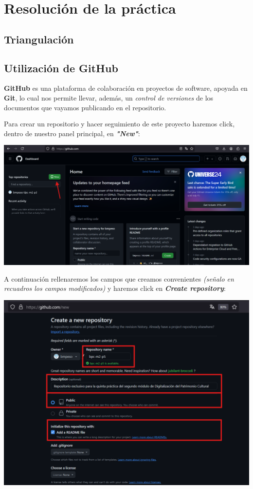 \documentclass[options]{article}
\begin{document}
\pagebreak

\section{Resolución de la práctica}
\subsection{Triangulación}

\subsection{Utilización de GitHub}

\textbf{GitHub} es una plataforma de colaboración en proyectos de software, apoyada en \textbf{Git}, lo cual nos permite llevar, además, un \textit{control de versiones} de los documentos que vayamos publicando en el repositorio. 


Para crear un repositorio y hacer seguimiento de este proyecto haremos click, dentro de nuestro panel principal, en \textbf{\textit{"New"}}:

\begin{center}
    \includegraphics[scale=0.35]{images/github_01.png}
\end{center}

A continuación rellenaremos los campos que creamos convenientes \textit{(señalo en recuadros los campos modificados)} y haremos click en \textbf{\textit{Create repository}}:

\begin{center}
    \includegraphics[scale=0.45]{images/github_02.png}
\end{center}
\end{document}
